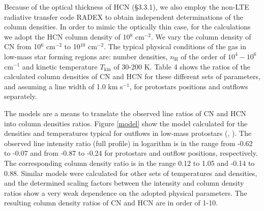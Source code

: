 \documentclass{aa}
\begin{document}
Because of the optical thickness of HCN (\S 3.3.1), we also employ the non-LTE radiative transfer code RADEX 
to obtain independent determinations of the column densities. In order to mimic the optically thin case,
for the calculations we adopt the HCN column density of 10$^8$ cm$^{-2}$. We vary the column density 
of CN from 10$^6$ cm$^{-2}$ to 10$^{10}$ cm$^{-2}$. The typical physical conditions of the gas 
in low-mass star forming regions are: number densities, $n_\mathrm{H}$ of the order of \textbf{$10^{4}-10^{6}$} cm$^{-1}$ 
and kinetic temperature $T_\mathrm{kin}$ of 30-200 K. Table 4 shows the ratios of the calculated 
column densities of CN and HCN for these different sets of parameters, and assuming a line width of 1.0 km s$^{-1}$, for protostars positions and outflows separately.

The models are a means to translate the observed line ratios of CN and HCN into column densities ratios. 
Figure \ref{model} show the model calculated for the densities and temperatures typical for 
outflows in low-mass protostars (\citealt{vK09}, \citealt{Yil15}). The observed line intensity ratio (full profile) 
in logarithm is in the range from -0.62 to -0.07 and from -0.87 to -0.24 for protostars and outflow positions, respectively. The corresponding column density ratio is
in the range 0.12 to 1.05 and -0.14 to 0.88. Similar models were calculated for other sets of 
temperatures and densities, and the determined scaling factors between the intensity and column
density ratios show a very weak dependence on the adopted physical parameters. The resulting 
column density ratios of CN and HCN are in order of 1-10. 

\end{document}
